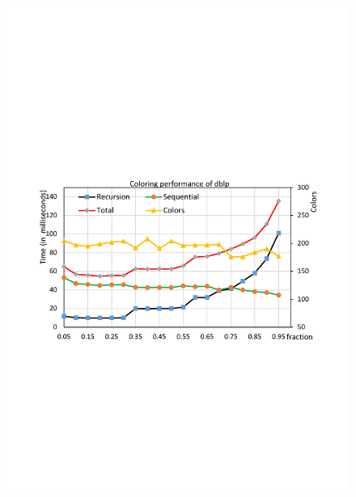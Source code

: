 \begin{figure}[t]
{		\includegraphics[scale=0.2]{figure/exp/dblp.pdf}
	} 
	\subfloat[Youtube]{
		\label{fig:youtube}
}
\end{figure}
